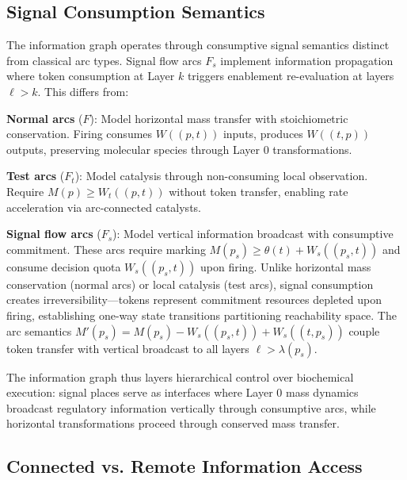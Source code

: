 \documentclass[10pt,letterpaper]{article}
\begin{document}
\subsection{Signal Consumption Semantics}

The information graph operates through consumptive signal semantics distinct from classical arc types. Signal flow arcs $F_s$ implement information propagation where token consumption at Layer $k$ triggers enablement re-evaluation at layers $\ell > k$. This differs from:

\textbf{Normal arcs} ($F$): Model horizontal mass transfer with stoichiometric conservation. Firing consumes $W((p,t))$ inputs, produces $W((t,p))$ outputs, preserving molecular species through Layer 0 transformations.

\textbf{Test arcs} ($F_t$): Model catalysis through non-consuming local observation. Require $M(p) \geq W_t((p,t))$ without token transfer, enabling rate acceleration via arc-connected catalysts.

\textbf{Signal flow arcs} ($F_s$): Model vertical information broadcast with consumptive commitment. These arcs require marking
$M(p_s) \geq \theta(t) + W_s((p_s,t))$
and consume decision quota $W_s((p_s,t))$ upon firing. Unlike horizontal mass conservation (normal arcs) or local catalysis (test arcs), signal consumption creates irreversibility---tokens represent commitment resources depleted upon firing, establishing one-way state transitions partitioning reachability space. The arc semantics
$M'(p_s) = M(p_s) - W_s((p_s,t)) + W_s((t,p_s))$
couple token transfer with vertical broadcast to all layers $\ell > \lambda(p_s)$.

The information graph thus layers hierarchical control over biochemical execution: signal places serve as interfaces where Layer 0 mass dynamics broadcast regulatory information vertically through consumptive arcs, while horizontal transformations proceed through conserved mass transfer.

\subsection{Connected vs. Remote Information Access}
\end{document}

